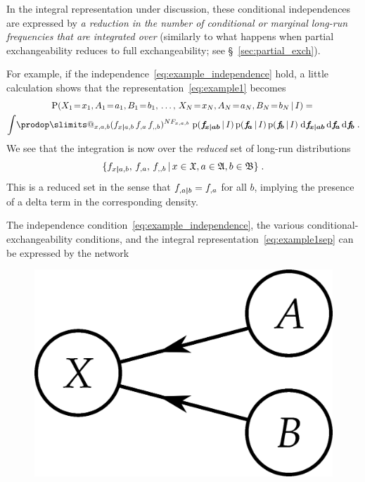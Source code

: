 \documentclass[\ifafour a4paper,12pt,\else a5paper,10pt,\fi%
onecolumn,oneside,article,%
british%
]{memoir}
\makeatletter
\theoremstyle{remark}
\theoremstyle{innote}
\def\prod{\DOTSI\prodop\slimits@}
\newcommand*{\di}{\mathrm{d}}%
\DeclarePairedDelimiter\set{\{}{\}}
\newcommand*{\pf}{\mathrm{p}}%
\newcommand*{\p}{\mathrm{P}}%
\renewcommand*{\|}[1][]{\nonscript\,#1\vert\nonscript\,\mathopen{}}
\newcommand*{\sect}{\S}%
\renewcommand*{\=}{\TextOrMath\texteq\eq}
\newcommand*{\X}[1]{X_{#1}}
\newcommand*{\x}[1]{x_{#1}}
\newcommand*{\A}[1]{A_{#1}}
\newcommand*{\va}[1]{a_{#1}}
\newcommand*{\B}[1]{B_{#1}}
\newcommand*{\vb}[1]{b_{#1}}
\newcommand*{\sX}{\mathfrak{X}}
\newcommand*{\sA}{\mathfrak{A}}
\newcommand*{\sB}{\mathfrak{B}}
\newcommand*{\ff}[1]{f_{#1}}
\newcommand*{\ffb}[1]{\bm{f_{\!#1}}}
\newcommand*{\FF}[1]{F_{#1}}
\newcommand*{\bcond}[1][]{\nonscript\,#1\bm{\vert}\nonscript\;\mathopen{}}
\makeatother
\begin{document}
In the integral representation under discussion, these conditional
independences are expressed by \emph{a reduction in the number of
  conditional or marginal long-run frequencies that are integrated over}
(similarly to what happens when partial exchangeability reduces to full
exchangeability; see \sect~\ref{sec:partial_exch}).

For example, if the independence~\eqref{eq:example_independence} hold, a
little calculation shows that the representation~\eqref{eq:example1} becomes
\begin{multline}
  \label{eq:example1sep}
  \p( \X{1}\=\x{1}, \A{1}\=\va{1}, \B{1}\=\vb{1},\, \dotsc,\,
   \X{N}\=\x{N}, \A{N}\=\va{N}, \B{N}\=\vb{N} \| I) ={}\\
     \int\!\prod_{x,a,b}
     (\ff{x \bcond a,b}\, \ff{,a}\, \ff{,,b})^{N \FF{x,a,b}}\;%
\pf(\ffb{x \bcond ab}\|I)\,\pf(\ffb{a}\|I)\,\pf(\ffb{b}\|I)
\;\di\ffb{x \bcond ab} \,\di\ffb{a} \,\di\ffb{b} \;.
\end{multline}
We see that the integration is now over the \emph{reduced} set of long-run
distributions
\begin{equation}
  \label{eq:subset_freqs}
  \set{\ff{x \bcond a,b},\, \ff{,a},\, \ff{,,b} \|
    x \in \sX, a \in \sA, b \in \sB} \;.
\end{equation}
This is a reduced set in the sense that $\ff{,a \bcond b} = \ff{,a}$ for
all $b$, implying the presence of a delta term in the corresponding
density.

The independence condition~\eqref{eq:example_independence}, the various
conditional-exchangeability conditions, and the integral
representation~\eqref{eq:example1sep} can be expressed by the network\\
\begin{figure}[h!]
\centering\includegraphics[scale=0.5]{bayesnet3s.png}
\caption{\label{fig:indep_net}}
\end{figure}%
\end{document}
